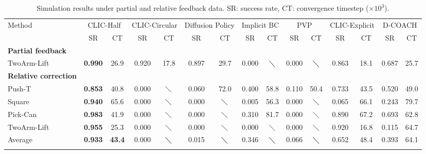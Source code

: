 \begin{table*}
\footnotesize
\caption{Simulation results under partial and relative feedback data. SR: success rate, CT: convergence timestep ($\times 10^3$). 
}
\label{tab:sim_exp_relative_partial}
\begin{center}
\begin{tabular}{lcccccccccc|cccc}
\Xhline{0.75pt}
Method & \multicolumn{2}{c}{CLIC-Half } & \multicolumn{2}{c}{CLIC-Circular } & \multicolumn{2}{c}{Diffusion Policy} & \multicolumn{2}{c}{Implicit BC} & \multicolumn{2}{c}{PVP} & \multicolumn{2}{c}{CLIC-Explicit} & \multicolumn{2}{c}{D-COACH} \\
 & SR & CT & SR & CT & SR & CT & SR & CT &SR & CT & SR & CT & SR & CT \\\hline
\textbf{Partial feedback } && & & & & & & & && & \\
TwoArm-Lift & \textbf{0.990} & 26.9 & 0.920 &  17.8   & 0.897 & 29.7 & 0.000 & $\diagdown$  & 0.000 & $\diagdown$ & 0.863 & 18.1 & 0.687 & 25.7 \\
\hline
\textbf{Relative correction} && & &  & & & & & & & && &  \\
Push-T & \textbf{0.853} & 40.8  & 0.000 & $\diagdown$    & 0.060 & 72.0 & 0.400 & 58.8 &   0.110	& 50.4   & 0.733 & 43.5 & 0.520 & 49.0 \\
Square & \textbf{0.940} & 65.6 & 0.000 & $\diagdown$    & 0.000 & $\diagdown$ & 0.005 & 56.3 &   0.000 & $\diagdown$    & 0.065 & 66.1 & 0.243 & 79.7 \\
Pick-Can & \textbf{0.983} & 41.9 &  0.000 & $\diagdown$    & 0.000 & $\diagdown$ & 0.310 & 81.7 &   0.000 & $\diagdown$    & 0.890 & 67.2 & 0.693 & 62.8 \\
TwoArm-Lift & \textbf{0.955} & 25.3    &  0.000 & $\diagdown$    & 0.000 & $\diagdown$   & 0.000  & $\diagdown$  &   0.000 & $\diagdown$   & 0.920 & 16.8 & 0.115 & 64.7 \\
\hline
Average & \textbf{0.933} & \textbf{43.4} &  0.000 & $\diagdown$    & 0.015 & $\diagdown$ & 0.346  & $\diagdown$ & 0.066 & $\diagdown$ & 0.652 & 48.4 & 0.393 & 64.1 \\
\Xhline{0.75pt}
\end{tabular}
\end{center}
\end{table*}
